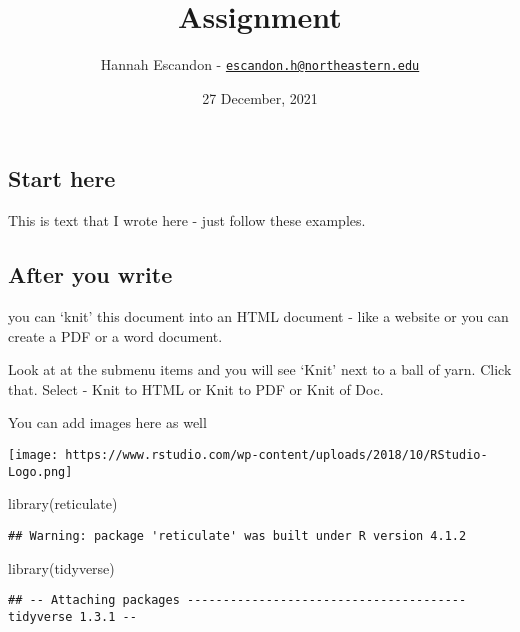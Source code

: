 \documentclass[
]{article}
\title{Assignment}
\author{Hannah Escandon -
\href{mailto:escandon.h@northeastern.edu}{\nolinkurl{escandon.h@northeastern.edu}}}
\date{27 December, 2021}
\newenvironment{Shaded}{\begin{snugshade}}{\end{snugshade}}
\newcommand{\FunctionTok}[1]{\textcolor[rgb]{0.00,0.00,0.00}{#1}}
\newcommand{\NormalTok}[1]{#1}
\begin{document}
\maketitle

{
\setcounter{tocdepth}{2}
\tableofcontents
}
\hypertarget{start-here}{%
\subsection{Start here}\label{start-here}}

This is text that I wrote here - just follow these examples.

\hypertarget{after-you-write}{%
\subsection{After you write}\label{after-you-write}}

you can `knit' this document into an HTML document - like a website or
you can create a PDF or a word document.

Look at at the submenu items and you will see `Knit' next to a ball of
yarn. Click that. Select - Knit to HTML or Knit to PDF or Knit of Doc.

You can add images here as well

\texttt{[image: https://www.rstudio.com/wp-content/uploads/2018/10/RStudio-Logo.png]}

\newpage

\begin{Shaded}
\begin{Highlighting}[]
\FunctionTok{library}\NormalTok{(reticulate)}
\end{Highlighting}
\end{Shaded}

\begin{verbatim}
## Warning: package 'reticulate' was built under R version 4.1.2
\end{verbatim}

\begin{Shaded}
\begin{Highlighting}[]
\FunctionTok{library}\NormalTok{(tidyverse)}
\end{Highlighting}
\end{Shaded}

\begin{verbatim}
## -- Attaching packages --------------------------------------- tidyverse 1.3.1 --
\end{verbatim}
\end{document}
